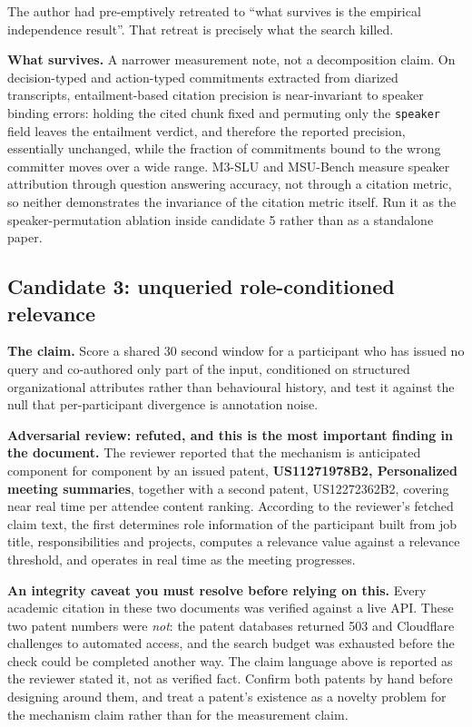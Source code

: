 The author had pre-emptively retreated to ``what survives is the empirical
independence result''. That retreat is precisely what the search killed.

\textbf{What survives.} A narrower measurement note, not a decomposition
claim. On decision-typed and action-typed commitments extracted from diarized
transcripts, entailment-based citation precision is near-invariant to speaker
binding errors: holding the cited chunk fixed and permuting only the
\texttt{speaker} field leaves the entailment verdict, and therefore the
reported precision, essentially unchanged, while the fraction of commitments
bound to the wrong committer moves over a wide range. M3-SLU and MSU-Bench
measure speaker attribution through question answering accuracy, not through a
citation metric, so neither demonstrates the invariance of the citation metric
itself. Run it as the speaker-permutation ablation inside candidate 5 rather
than as a standalone paper.

\subsection{Candidate 3: unqueried role-conditioned relevance}

\textbf{The claim.} Score a shared 30 second window for a participant who has
issued no query and co-authored only part of the input, conditioned on
structured organizational attributes rather than behavioural history, and test
it against the null that per-participant divergence is annotation noise.

\textbf{Adversarial review: refuted, and this is the most important finding in
the document.} The reviewer reported that the mechanism is anticipated
component for component by an issued patent, \textbf{US11271978B2, Personalized
meeting summaries}, together with a second patent, US12272362B2, covering near
real time per attendee content ranking. According to the reviewer's fetched
claim text, the first determines role information of the participant built from
job title, responsibilities and projects, computes a relevance value against a
relevance threshold, and operates in real time as the meeting progresses.

\textbf{An integrity caveat you must resolve before relying on this.} Every
academic citation in these two documents was verified against a live API. These
two patent numbers were \emph{not}: the patent databases returned 503 and
Cloudflare challenges to automated access, and the search budget was exhausted
before the check could be completed another way. The claim language above is
reported as the reviewer stated it, not as verified fact. Confirm both patents
by hand before designing around them, and treat a patent's existence as a
novelty problem for the mechanism claim rather than for the measurement claim.

